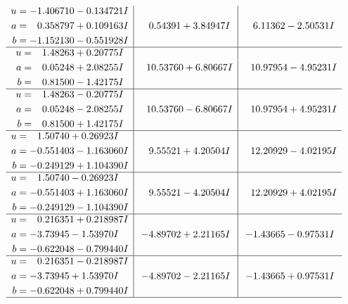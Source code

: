\documentclass[1p]{elsarticle_modified}
\theoremstyle{definition}
\begin{document}
$$\begin{array}{c|c|c}
\begin{aligned}
u &= -1.406710 - 0.134721 I \\
a &= \phantom{-}0.358797 + 0.109163 I \\
b &= -1.152130 - 0.551928 I\end{aligned}
 & \phantom{-}0.54391 + 3.84947 I & \phantom{-}6.11362 - 2.50531 I \\ \hline\begin{aligned}
u &= \phantom{-}1.48263 + 0.20775 I \\
a &= \phantom{-}0.05248 + 2.08255 I \\
b &= \phantom{-}0.81500 - 1.42175 I\end{aligned}
 & \phantom{-}10.53760 + 6.80667 I & \phantom{-}10.97954 - 4.95231 I \\ \hline\begin{aligned}
u &= \phantom{-}1.48263 - 0.20775 I \\
a &= \phantom{-}0.05248 - 2.08255 I \\
b &= \phantom{-}0.81500 + 1.42175 I\end{aligned}
 & \phantom{-}10.53760 - 6.80667 I & \phantom{-}10.97954 + 4.95231 I \\ \hline\begin{aligned}
u &= \phantom{-}1.50740 + 0.26923 I \\
a &= -0.551403 - 1.163060 I \\
b &= -0.249129 + 1.104390 I\end{aligned}
 & \phantom{-}9.55521 + 4.20504 I & \phantom{-}12.20929 - 4.02195 I \\ \hline\begin{aligned}
u &= \phantom{-}1.50740 - 0.26923 I \\
a &= -0.551403 + 1.163060 I \\
b &= -0.249129 - 1.104390 I\end{aligned}
 & \phantom{-}9.55521 - 4.20504 I & \phantom{-}12.20929 + 4.02195 I \\ \hline\begin{aligned}
u &= \phantom{-}0.216351 + 0.218987 I \\
a &= -3.73945 - 1.53970 I \\
b &= -0.622048 - 0.799440 I\end{aligned}
 & -4.89702 + 2.21165 I & -1.43665 - 0.97531 I \\ \hline\begin{aligned}
u &= \phantom{-}0.216351 - 0.218987 I \\
a &= -3.73945 + 1.53970 I \\
b &= -0.622048 + 0.799440 I\end{aligned}
 & -4.89702 - 2.21165 I & -1.43665 + 0.97531 I\\
 \hline 
 \end{array}$$\newpage
\end{document}
